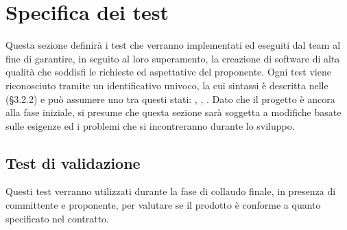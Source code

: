 \pagebreak
\section{Specifica dei test}
Questa sezione definirà i test che verranno implementati ed eseguiti dal team al fine di garantire, in seguito al loro superamento, la creazione di software di alta qualità che soddisfi le richieste ed aspettative del proponente. 
Ogni test viene riconosciuto tramite un identificativo univoco, la cui sintassi è descritta nelle \NdP (§3.2.2) e può assumere uno tra questi stati: \Ts, \Ti, \Ts. 
Dato che il progetto è ancora alla fase iniziale, si presume che questa sezione sarà soggetta a modifiche basate sulle esigenze ed i problemi che si incontreranno durante lo sviluppo.

\subsection{Test di validazione}
Questi test verranno utilizzati durante la fase di collaudo finale, in presenza di committente e proponente, per valutare se il prodotto è conforme a quanto specificato nel contratto.

